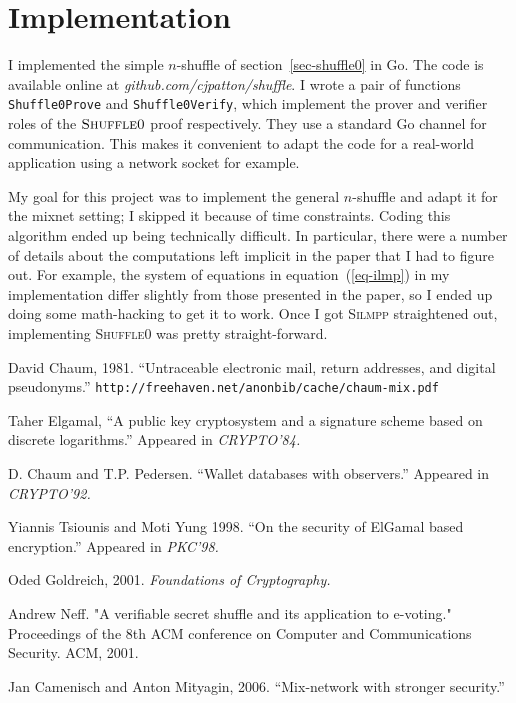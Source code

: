 \documentclass[letter]{article}
\begin{document}
\section{Implementation} \label{sec-implementation}
I implemented the simple $n$-shuffle of section~\ref{sec-shuffle0} in Go. The
code is available online at \textit{github.com/cjpatton/shuffle}. I wrote
a pair of functions \texttt{Shuffle0Prove} and \texttt{Shuffle0Verify}, which
implement the prover and verifier roles of the $\textsc{Shuffle0}$ proof
respectively. They use a standard Go channel for communication. This makes it
convenient to adapt the code for a real-world application using a network socket
for example.

My goal for this project was to implement the general $n$-shuffle and adapt it
for the mixnet setting; I skipped it because of time constraints. Coding this
algorithm ended up being technically difficult. In particular, there were a
number of details about the computations left implicit in the paper that I had
to figure out. For example, the system of equations in equation~(\ref{eq-ilmp})
in my implementation differ slightly from those presented in the paper, so I
ended up doing some math-hacking to get it to work. Once I got \textsc{Silmpp}
straightened out, implementing \textsc{Shuffle0} was pretty straight-forward.

\begin{thebibliography}{99}

   David Chaum, 1981. ``Untraceable electronic mail, return addresses, and digital pseudonyms.''
    {\tt http://freehaven.net/anonbib/cache/chaum-mix.pdf}

   Taher Elgamal, ``A public key cryptosystem and a signature
    scheme based on discrete logarithms.'' Appeared in \textit{CRYPTO'84.}

    D. Chaum and T.P. Pedersen. ``Wallet databases with
    observers.'' Appeared in \textit{CRYPTO'92.}

   Yiannis Tsiounis and Moti Yung 1998. ``On the security of
    ElGamal based encryption.'' Appeared in \textit{PKC'98.}

   Oded Goldreich, 2001. \textit{Foundations of Cryptography.}

    Andrew Neff. "A verifiable secret shuffle and its application to e-voting."
    Proceedings of the 8th ACM conference on Computer and Communications Security.
    ACM, 2001.

   Jan Camenisch and Anton Mityagin, 2006. ``Mix-network with
    stronger security.''

\end{thebibliography}
\end{document}
